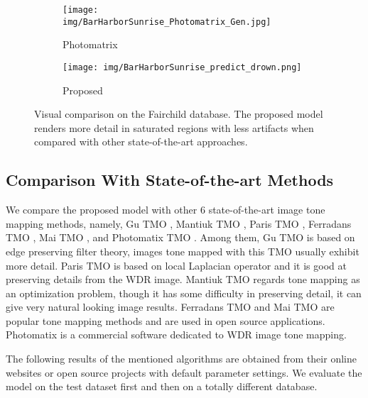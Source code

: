 \documentclass[journal]{IEEEtran}
\begin{document}
\begin{figure*}[tb]
        \begin{subfigure}[b]{0.245\textwidth}   
            \centering 
            \texttt{[image: img/BarHarborSunrise\_Photomatrix\_Gen.jpg]}
            \caption[]%
            {{\small Photomatrix\cite{photomatrix} }}    
            \label{fig:mean and std of net34}
        \end{subfigure}
        \begin{subfigure}[b]{0.245\textwidth}   
            \centering 
            \texttt{[image: img/BarHarborSunrise\_predict\_drown.png]}
            \caption[]%
            {{\small Proposed  }}    
            \label{fig:mean and std of net44}
        \end{subfigure}
        \caption{Visual comparison on the Fairchild database. The proposed model renders more detail in saturated regions with less artifacts when compared with other state-of-the-art approaches.}
        \label{fig:fairchild_result}
\end{figure*} 

\subsection{Comparison With State-of-the-art Methods}

We compare the proposed model with other 6 state-of-the-art image tone mapping methods, namely, Gu TMO \cite{gu2013local}, Mantiuk TMO \cite{mantiuk2008display}, Paris TMO \cite{paris2015local}, Ferradans TMO \cite{ferradans2011analysis}, Mai TMO \cite{mai2011optimizing}, and Photomatix TMO \cite{photomatrix}. Among them, Gu TMO \cite{gu2013local} is based on edge preserving filter theory, images tone mapped with this TMO usually exhibit more detail. Paris TMO \cite{paris2015local} is based on local Laplacian operator and it is good at preserving details from the WDR image. Mantiuk TMO \cite{mantiuk2008display} regards tone mapping as an optimization problem, though it has some difficulty in preserving detail, it can give very natural looking image results.  Ferradans TMO \cite{ferradans2011analysis} and  Mai TMO \cite{mai2011optimizing} are popular tone mapping methods and are used in open source applications. Photomatix is a commercial software dedicated to WDR image tone mapping. 

The following results of the mentioned algorithms are obtained from their online websites or open source projects with default parameter settings. We evaluate the model on the test dataset first and then on a totally different database. 
\end{document}
